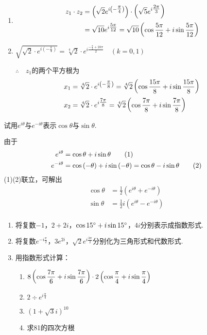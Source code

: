\begin{solution}
\begin{enumerate}[(1)]
    \item \[\begin{split}
z_1\cdot z_2&=\left(\sqrt{2} e^{i\left(-\tfrac{\pi}{4}\right)}\right)\cdot \left(\sqrt{5} e^{i\tfrac{2\pi}{3}}\right)\\
&=\sqrt{10}e^{i\tfrac{5\pi}{12}}=\sqrt{10}\left(\cos{\dfrac{5\pi}{12}}+i\sin{\dfrac{5\pi}{12}}\right)
    \end{split}\]
\item $\sqrt{\sqrt{2}\cdot e^{i\left(-\tfrac{\pi}{4}\right)}}=\sqrt[4]{2}\cdot e^{i\tfrac{-\tfrac{\pi}{4}+2k\pi}{2}}\quad (k=0,1)$

$\therefore\quad z_1$的两个平方根为
\[\begin{split}
x_1&=\sqrt[4]{2}\cdot e^{i\left(-\tfrac{\pi}{8}\right)}=\sqrt[4]{2}\left(\cos{\dfrac{15\pi}{8}}+i\sin{\dfrac{15\pi}{8}}\right)\\
x_2&=\sqrt[4]{2}\cdot e^{i\tfrac{7\pi}{8}}=\sqrt[4]{2}\left(\cos{\dfrac{7\pi}{8}}+i\sin{\dfrac{7\pi}{8}}\right)
\end{split}\]
\end{enumerate}
\end{solution}



\begin{example}
试用$e^{i\theta}$与$e^{-i\theta}$表示$\cos\theta$与$\sin\theta$.    
\end{example}

\begin{solution}
由于
\begin{align}
e^{i\theta}&= \cos{\theta}+i\sin{\theta} \tag{1}\\
e^{-i\theta}&= \cos\left(-\theta\right)+i\sin\left(-\theta\right)=\cos\theta-i\sin\theta \tag{2}
\end{align}
(1)(2)联立，可解出
\[\begin{split}
    \cos\theta&=\frac{1}{2}\left(e^{i\theta}+e^{-i\theta}\right)\\
    \sin\theta&=\frac{1}{2}i\left(e^{i\theta}-e^{-i\theta}\right)\\
\end{split}\]
\end{solution}

\begin{ex}
\begin{enumerate}
    \item 将复数$-1$，$2+2i$，$\cos{15^{\circ}}+i\sin{15^{\circ}}$，$4i$分别表示成指数形式.
    \item 将复数$e^{-i\tfrac{\pi}{2}}$，$3e^{2i}$，$\sqrt{2}e^{i\tfrac{3\pi}{2}}$分别化为三角形式和代数形式.
    \item 用指数形式计算：
\begin{enumerate}[(1)]
    \item $8\left(\cos{\dfrac{7\pi}{6}}+i\sin{\dfrac{7\pi}{6}}\right)\cdot 2\left(\cos{\dfrac{\pi}{4}}+i\sin{\dfrac{\pi}{4}}\right)$
    \item $2\div e^{i\tfrac{\pi}{4}}$
    \item $(1+\sqrt{3}i)^{10}$
    \item 求81的四次方根
\end{enumerate}
\end{enumerate}
\end{ex}


